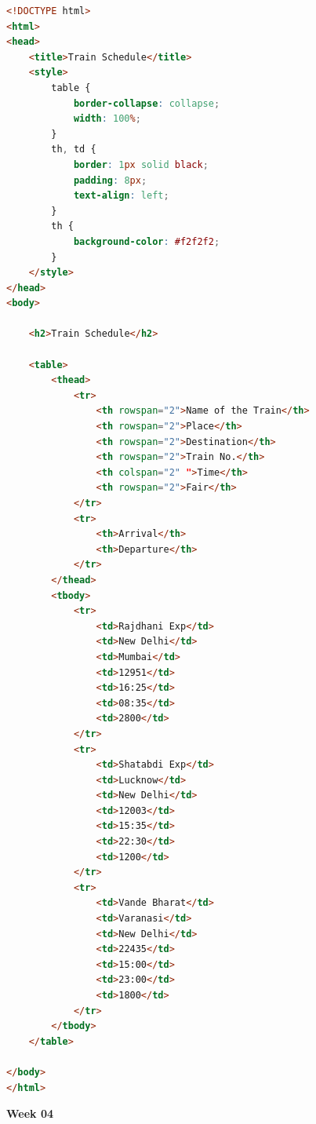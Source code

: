 \documentclass[a4paper,12pt]{article}
\begin{document}
\begin{lstlisting}[language=HTML, caption={HTML Code for Train Schedule Table}]
<!DOCTYPE html>
<html>
<head>
    <title>Train Schedule</title>
    <style>
        table {
            border-collapse: collapse;
            width: 100%;
        }
        th, td {
            border: 1px solid black;
            padding: 8px;
            text-align: left;
        }
        th {
            background-color: #f2f2f2;
        }
    </style>
</head>
<body>

    <h2>Train Schedule</h2>

    <table>
        <thead>
            <tr>
                <th rowspan="2">Name of the Train</th>
                <th rowspan="2">Place</th>
                <th rowspan="2">Destination</th>
                <th rowspan="2">Train No.</th>
                <th colspan="2" ">Time</th>
                <th rowspan="2">Fair</th>
            </tr>
            <tr>
                <th>Arrival</th>
                <th>Departure</th>
            </tr>
        </thead>
        <tbody>
            <tr>
                <td>Rajdhani Exp</td>
                <td>New Delhi</td>
                <td>Mumbai</td>
                <td>12951</td>
                <td>16:25</td>
                <td>08:35</td>
                <td>2800</td>
            </tr>
            <tr>
                <td>Shatabdi Exp</td>
                <td>Lucknow</td>
                <td>New Delhi</td>
                <td>12003</td>
                <td>15:35</td>
                <td>22:30</td>
                <td>1200</td>
            </tr>
            <tr>
                <td>Vande Bharat</td>
                <td>Varanasi</td>
                <td>New Delhi</td>
                <td>22435</td>
                <td>15:00</td>
                <td>23:00</td>
                <td>1800</td>
            </tr>
        </tbody>
    </table>

</body>
</html>
\end{lstlisting}

\newpage
{} %

\begin{center}
    \vspace*{1cm}
    {\Huge \textbf{Week 04}} \\
    \vspace{0.5cm}
    \vspace{1cm}
\end{center}
\end{document}
